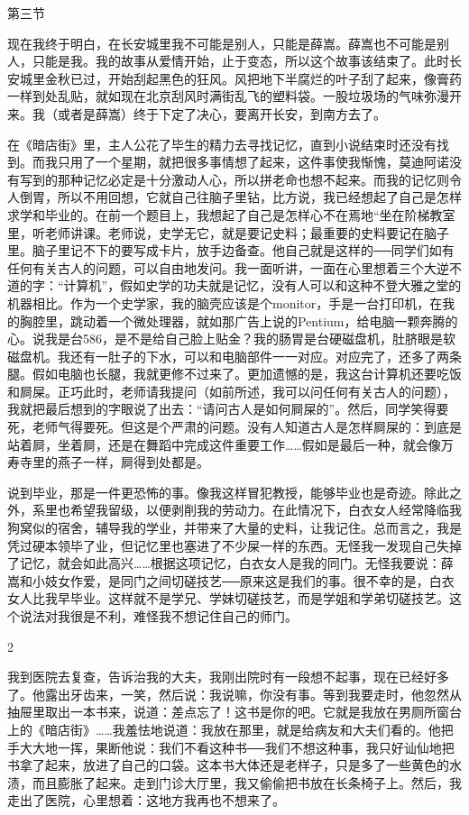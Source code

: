 第三节 

现在我终于明白，在长安城里我不可能是别人，只能是薛嵩。薛嵩也不可能是别人，只能是我。我的故事从爱情开始，止于变态，所以这个故事该结束了。此时长安城里金秋已过，开始刮起黑色的狂风。风把地下半腐烂的叶子刮了起来，像膏药一样到处乱贴，就如现在北京刮风时满街乱飞的塑料袋。一股垃圾场的气味弥漫开来。我（或者是薛嵩）终于下定了决心，要离开长安，到南方去了。 

在《暗店街》里，主人公花了毕生的精力去寻找记忆，直到小说结束时还没有找到。而我只用了一个星期，就把很多事情想了起来，这件事使我惭愧，莫迪阿诺没有写到的那种记忆必定是十分激动人心，所以拼老命也想不起来。而我的记忆则令人倒胃，所以不用回想，它就自己往脑子里钻，比方说，我已经想起了自己是怎样求学和毕业的。在前一个题目上，我想起了自己是怎样心不在焉地“坐在阶梯教室里，听老师讲课。老师说，史学无它，就是要记史料；最重要的史料要记在脑子里。脑子里记不下的要写成卡片，放手边备查。他自己就是这样的──同学们如有任何有关古人的问题，可以自由地发问。我一面听讲，一面在心里想着三个大逆不道的字：“计算机”，假如史学的功夫就是记忆，没有人可以和这种不登大雅之堂的机器相比。作为一个史学家，我的脑壳应该是个monitor，手是一台打印机，在我的胸腔里，跳动着一个微处理器，就如那广告上说的Pentium，给电脑一颗奔腾的心。说我是台586，是不是给自己脸上贴金？我的肠胃是台硬磁盘机，肚脐眼是软磁盘机。我还有一肚子的下水，可以和电脑部件一一对应。对应完了，还多了两条腿。假如电脑也长腿，我就更修不过来了。更加遗憾的是，我这台计算机还要吃饭和屙屎。正巧此时，老师请我提问（如前所述，我可以问任何有关古人的问题），我就把最后想到的字眼说了出去：“请问古人是如何屙屎的”。然后，同学笑得要死，老师气得要死。但这是个严肃的问题。没有人知道古人是怎样屙屎的：到底是站着屙，坐着屙，还是在舞蹈中完成这件重要工作……假如是最后一种，就会像万寿寺里的燕子一样，屙得到处都是。 

说到毕业，那是一件更恐怖的事。像我这样冒犯教授，能够毕业也是奇迹。除此之外，系里也希望我留级，以便剥削我的劳动力。在此情况下，白衣女人经常降临我狗窝似的宿舍，辅导我的学业，并带来了大量的史料，让我记住。总而言之，我是凭过硬本领毕了业，但记忆里也塞进了不少屎一样的东西。无怪我一发现自己失掉了记忆，就会如此高兴……根据这项记忆，白衣女人是我的同门。无怪我要说：薛嵩和小妓女作爱，是同门之间切磋技艺──原来这是我们的事。很不幸的是，白衣女人比我早毕业。这样就不是学兄、学妹切磋技艺，而是学姐和学弟切磋技艺。这个说法对我很是不利，难怪我不想记住自己的师门。 

2 

我到医院去复查，告诉治我的大夫，我刚出院时有一段想不起事，现在已经好多了。他露出牙齿来，一笑，然后说：我说嘛，你没有事。等到我要走时，他忽然从抽屉里取出一本书来，说道：差点忘了！这书是你的吧。它就是我放在男厕所窗台上的《暗店街》……我羞怯地说道：我放在那里，就是给病友和大夫们看的。他把手大大地一挥，果断他说：我们不看这种书──我们不想这种事，我只好讪仙地把书拿了起来，放进了自己的口袋。这本书大体还是老样子，只是多了一些黄色的水渍，而且膨胀了起来。走到门诊大厅里，我又偷偷把书放在长条椅子上。然后，我走出了医院，心里想着：这地方我再也不想来了。 

